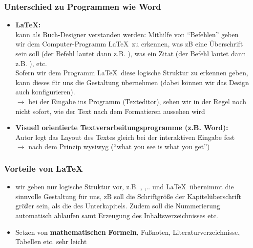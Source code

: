 \subsubsection{Unterschied zu Programmen wie Word}
\begin{itemize}
	\item \textbf{\LaTeX:}\\ kann als Buch-Designer verstanden werden: Mithilfe von ``Befehlen'' geben wir dem Computer-Programm \LaTeX~zu erkennen, was zB eine Überschrift sein soll (der Befehl lautet dann z.B. ), was ein Zitat (der Befehl lautet dann z.B. ), etc.\\ 
	Sofern wir dem Programm \LaTeX~diese logische Struktur zu erkennen geben, kann dieses für uns die Gestaltung übernehmen (dabei können wir das Design auch konfigurieren).\\[0.1cm]
	$\to$ bei der Eingabe ins Programm (Texteditor), sehen wir in der Regel noch nicht sofort, wie der Text nach dem Formatieren aussehen wird \\
	\item \textbf{Visuell orientierte Textverarbeitungsprogramme (z.B. Word):}\\ Autor legt das Layout des Textes gleich bei der interaktiven Eingabe fest\\[0.1cm]
	$\to$ nach dem Prinzip wysiwyg (``what you see is what you get'')
\end{itemize}

\subsubsection{Vorteile von \LaTeX}
\begin{itemize}
	\item wir geben nur logische Struktur vor, z.B. , ,.. und \LaTeX\ übernimmt die sinnvolle Gestaltung für uns, zB soll die Schriftgröße der Kapitelüberschrift größer sein, als die des Unterkapitels. Zudem soll die Nummerierung automatisch ablaufen samt Erzeugung des Inhaltsverzeichnisses etc.
	\item Setzen von \textbf{mathematischen Formeln}, Fußnoten, Literaturverzeichnisse, Tabellen etc. sehr leicht
\end{itemize}

